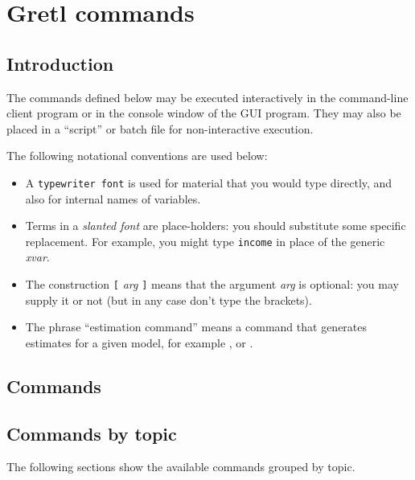\chapter{Gretl commands}
\label{cmdref}

\section{Introduction}
\label{cmd-intro}

The commands defined below may be executed interactively in the
command-line client program or in the console window of the GUI
program.  They may also be placed in a ``script'' or batch file for
non-interactive execution.
    
The following notational conventions are used below:
    
\begin{itemize}

\item A \texttt{typewriter font} is used for material that you would
  type directly, and also for internal names of variables.

\item Terms in a \textsl{slanted font} are place-holders: you should
  substitute some specific replacement.  For example, you might type
  \texttt{income} in place of the generic \textsl{xvar}.

\item The construction \texttt{[} \textsl{arg} \texttt{]} means that
  the argument \textsl{arg} is optional: you may supply it or not (but
  in any case don't type the brackets).

\item The phrase ``estimation command'' means a command that generates
  estimates for a given model, for example ,  or
  .

\end{itemize}

\section{Commands}
\label{cmd-cmd}



\section{Commands by topic}
\label{cmd-topics}

The following sections show the available commands grouped by topic.





